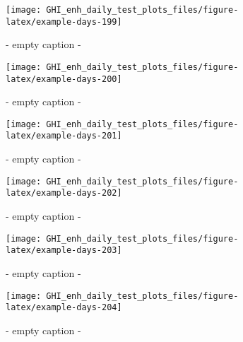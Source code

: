 \documentclass[
  10pt,
  a4paper,oneside]{article}
\begin{document}
\begin{figure}[H]

{\centering \texttt{[image: GHI\_enh\_daily\_test\_plots\_files/figure-latex/example-days-199]} 

}

\caption{ - empty caption - }\label{fig:example-days-199}
\end{figure}

\begin{figure}[H]

{\centering \texttt{[image: GHI\_enh\_daily\_test\_plots\_files/figure-latex/example-days-200]} 

}

\caption{ - empty caption - }\label{fig:example-days-200}
\end{figure}

\begin{figure}[H]

{\centering \texttt{[image: GHI\_enh\_daily\_test\_plots\_files/figure-latex/example-days-201]} 

}

\caption{ - empty caption - }\label{fig:example-days-201}
\end{figure}

\begin{figure}[H]

{\centering \texttt{[image: GHI\_enh\_daily\_test\_plots\_files/figure-latex/example-days-202]} 

}

\caption{ - empty caption - }\label{fig:example-days-202}
\end{figure}

\begin{figure}[H]

{\centering \texttt{[image: GHI\_enh\_daily\_test\_plots\_files/figure-latex/example-days-203]} 

}

\caption{ - empty caption - }\label{fig:example-days-203}
\end{figure}

\begin{figure}[H]

{\centering \texttt{[image: GHI\_enh\_daily\_test\_plots\_files/figure-latex/example-days-204]} 

}

\caption{ - empty caption - }\label{fig:example-days-204}
\end{figure}
\end{document}
